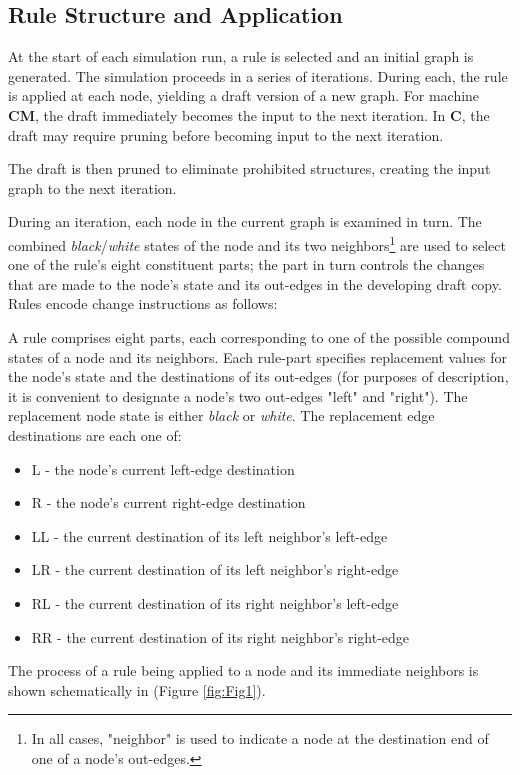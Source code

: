 \documentclass[twoside,twocolumn]{article}
\begin{document}
\subsection{Rule Structure and Application}

At the start of each simulation run, a rule is selected and an initial graph
is generated.  The simulation proceeds in a series of
iterations. During each, the rule is applied at each node, yielding a draft
version of a new graph. For machine \textbf{CM}, the draft immediately becomes
the input to the next iteration. In \textbf{C}, the draft may require pruning
before becoming input to the next iteration. 

The draft is then pruned to eliminate
prohibited structures, creating the input graph to the next iteration.

During an iteration, each node in the current graph is examined in turn.
The combined \textit{black}/\textit{white} states of the node and its two neighbors\footnote{In
all cases, "neighbor" is used to indicate a node at the destination end of one of a node's out-edges.}
are used to select one of the rule's eight constituent parts; the part in turn
controls the changes that are made to the node's state and its out-edges in
the developing draft copy. Rules encode change instructions as follows:

A rule comprises eight parts, each corresponding to one of the possible compound states
of a node and its neighbors. Each rule-part specifies replacement values for
the node's state and the destinations of its out-edges
(for purposes of description, it is convenient to designate a node's two out-edges "left" and "right").
The replacement node state is either \textit{black} or \textit{white}.
The replacement edge destinations are each one of:

\begin{itemize}
    \item L - the node's current left-edge destination
    \item R - the node's current right-edge destination
    \item LL - the current destination of its left neighbor's left-edge
    \item LR - the current destination of its left neighbor's right-edge
    \item RL - the current destination of its right neighbor's left-edge
    \item RR - the current destination of its right neighbor's right-edge
\end{itemize}
The process of a rule being applied to a node and its immediate neighbors is shown
schematically in (Figure \ref{fig:Fig1}).
\end{document}
